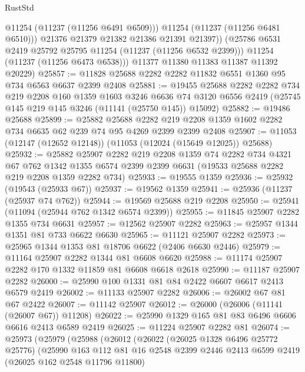 \begin{lexlean}{RustStd}
\begin{coremodule}
                @11254
                (@11237 (@11256 @6491 @6509)))
              @11254
              (@11237 (@11256 @6481 @6510)))
            @21376
            @21379
            @21382
            @21386
            @21391
            @21397))
        (@25786 @6531 @2419 @25792 @25795 @11254 (@11237 (@11256 @6532 @2399)))
        @11254
        (@11237 (@11256 @6473 @6538)))
      @11377
      @11380
      @11383
      @11387
      @11392
      @20229)
@25857 := @11828 @25688 @2282 @2282 @11832 @6551 @1360 @95 @734 @6563 @6637 @2399 @2408
@25881 := @19455
    @25688
    @2282
    @2282
    @734
    @219
    @2208
    @160
    @1359
    @1603
    @3246
    @6636
    @74
    @3120
    @6556
    @2419
    (@25745 @145 @219 @145 @3246 (@11141 (@25750 @145)) @15092)
@25882 := @19486 @25688
@25899 := @25882
    @25688
    @2282
    @219
    @2208
    @1359
    @1602
    @2282
    @734
    @6635
    @62
    @239
    @74
    @95
    @4269
    @2399
    @2399
    @2408
@25907 := @11053 (@12147 (@12652 @12148)) (@11053 (@12024 (@15649 @12025)) @25688)
@25932 := @25882
    @25907
    @2282
    @219
    @2208
    @1359
    @74
    @2282
    @734
    @4321
    @67
    @762
    @1342
    @1355
    @6574
    @2399
    @2399
    @6631
    (@19533 @25688 @2282 @219 @2208 @1359 @2282 @734)
@25933 := @19555 @1359
@25936 := @25932 (@19543 (@25933 @67))
@25937 := @19562 @1359
@25941 := @25936 (@11237 (@25937 @74 @762))
@25944 := @19569 @25688 @219 @2208
@25950 := @25941 (@11094 (@25944 @762 @1342 @6574 @2399))
@25955 := @11845 @25907 @2282 @1355 @734 @6631
@25957 := @12562 @25907 @2282
@25963 := @25957 @1344 @1351 @81 @733 @6622 @6630
@25965 := @11121 @25907 @2282
@25973 := @25965 @1344 @1353 @81 @18706 @6622 (@2406 @6630 @2446)
@25979 := @11164 @25907 @2282 @1344 @81 @6608 @6620
@25988 := @11174 @25907 @2282 @170 @1332 @11859 @81 @6608 @6618 @2618
@25990 := @11187 @25907 @2282
@26000 := @25990 @100 @1331 @81 @84 @2422 @6607 @6617 @2413 @6579 @2419
@26002 := @11133 @25907 @2282
@26006 := @26002 @67 @81 @67 @2422
@26007 := @11142 @25907
@26012 := @26000 (@26006 (@11141 (@26007 @67)) @11208)
@26022 := @25990 @1329 @165 @81 @83 @6496 @6606 @6616 @2413 @6589 @2419
@26025 := @11224 @25907 @2282 @81
@26074 := @25973
    (@25979
      (@25988
        (@26012
          (@26022
            (@26025 @1328 @6496 @25772 @25776)
            (@25990
              @163
              @112
              @81
              @16
              @2548
              @2399
              @2446
              @2413
              @6599
              @2419
              (@26025 @162 @2548 @11796 @11800)

\end{coremodule}
\end{lexlean}
